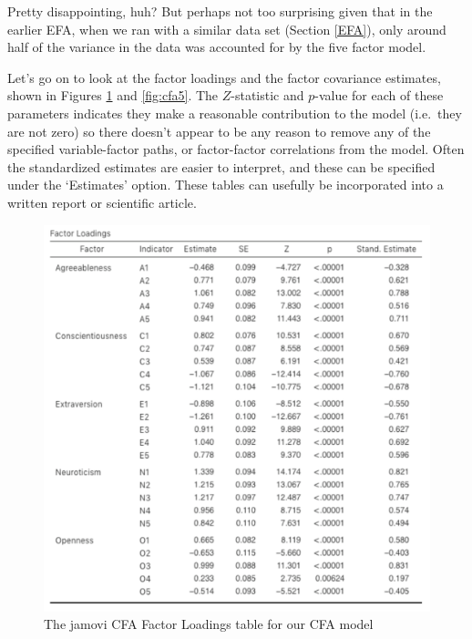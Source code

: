 \documentclass[
]{book}
\begin{document}
Pretty disappointing, huh? But perhaps not too surprising given that in the earlier EFA, when we ran with a similar data set (Section \ref{EFA}), only around half of the variance in the data was accounted for by the five factor model.

Let's go on to look at the factor loadings and the factor covariance estimates, shown in Figures \ref{fig:cfa4} and \ref{fig:cfa5}. The \(Z\)-statistic and \(p\)-value for each of these parameters indicates they make a reasonable contribution to the model (i.e.~they are not zero) so there doesn't appear to be any reason to remove any of the specified variable-factor paths, or factor-factor correlations from the model. Often the standardized estimates are easier to interpret, and these can be specified under the `Estimates' option. These tables can usefully be incorporated into a written report or scientific article.

\begin{figure}

{\centering \includegraphics[width=1\linewidth]{img/factoranalysis/cfa4} 

}

\caption{The jamovi CFA Factor Loadings table for our CFA model}\label{fig:cfa4}
\end{figure}
\end{document}
